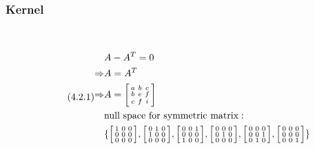 \documentclass{article}
\begin{document}
\subsubsection{Kernel}

~

\begin{equation}
\tag{4.2.1}
\begin{split}
&A-A^T=0\\
\Rightarrow &A=A^T\\
\Rightarrow &A=\begin{bsmallmatrix}a&b&c\\b&e&f\\c&f&i\end{bsmallmatrix}\\
&\text{null space for symmetric matrix}:\\
& \{\begin{bsmallmatrix}1&0&0\\0&0&0\\0&0&0\end{bsmallmatrix},\begin{bsmallmatrix}0&1&0\\1&0&0\\0&0&0\end{bsmallmatrix},\begin{bsmallmatrix}0&0&1\\0&0&0\\1&0&0\end{bsmallmatrix},\begin{bsmallmatrix}0&0&0\\0&1&0\\0&0&0\end{bsmallmatrix},\begin{bsmallmatrix}0&0&0\\0&0&1\\0&1&0\end{bsmallmatrix},\begin{bsmallmatrix}0&0&0\\0&0&0\\0&0&1\end{bsmallmatrix}\}\\

\end{split}
\end{equation}
\end{document}

